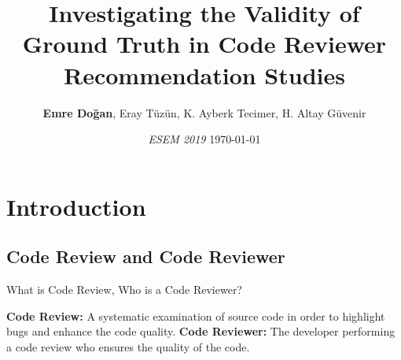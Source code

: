 \documentclass{beamer}
\title{Investigating the Validity of Ground Truth in Code Reviewer Recommendation Studies }
\author[]{
 \textbf{Emre Doğan}, Eray Tüzün, K. Ayberk Tecimer, H. Altay Güvenir}
\institute{MSc Student \newline Computer Engineering Department \newline Bilkent University}
\date
    {\small\textit{{ESEM 2019}}\newline
    \today
    }
\begin{document}
\begin{frame}
  \titlepage
\end{frame}

%


\section{Introduction}

\subsection{Code Review and Code Reviewer}

\begin{frame}{\large What is Code Review, Who is a Code Reviewer?}

  \textbf{Code Review:} A systematic examination of source code in order to highlight bugs and enhance the code quality.
  \pause
  \newline \newline
  \textbf{Code Reviewer:} The developer performing a code review who ensures the quality of the code.
  \pause
    
  
\end{frame}
\end{document}

